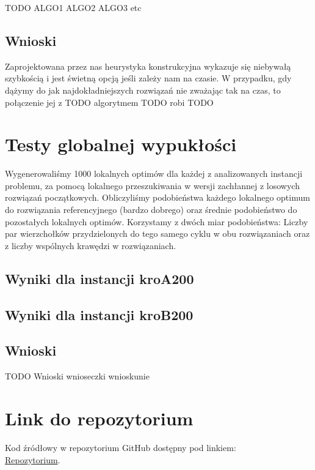 \documentclass[11pt]{article}
\begin{document}
TODO
ALGO1
ALGO2
ALGO3
etc

\subsection{Wnioski}\label{subsec:wnioski}
Zaprojektowana przez nas heurystyka konstrukcyjna wykazuje się niebywałą szybkością i jest świetną opcją jeśli zależy nam na czasie.
W przypadku, gdy dążymy do jak najdokładniejszych rozwiązań nie zważając tak na czas, to połączenie jej z TODO algorytmem TODO robi TODO


\section{Testy globalnej wypukłości}\label{sec:testy-globalnej-wypukosci}

Wygenerowaliśmy 1000 lokalnych optimów dla każdej z analizowanych instancji problemu, za pomocą lokalnego przeszukiwania w wersji zachłannej z losowych rozwiązań początkowych.
Obliczyliśmy podobieństwa każdego lokalnego optimum do rozwiązania referencyjnego (bardzo dobrego) oraz średnie podobieństwo do pozostałych lokalnych optimów.
Korzystamy z dwóch miar podobieństwa: Liczby par wierzchołków przydzielonych do tego samego cyklu w obu rozwiązaniach oraz z liczby wspólnych krawędzi w rozwiązaniach.

\subsection{Wyniki dla instancji kroA200}\label{subsec:wyniki-dla-instancji-kroa200}

\subsection{Wyniki dla instancji kroB200}\label{subsec:wyniki-dla-instancji-krob200}


\subsection{Wnioski}\label{subsec:wnioski-wypuklosci}

TODO
Wnioski wnioseczki wnioskunie


\section{Link do repozytorium}\label{sec:link-do-repo}
Kod źródłowy w repozytorium GitHub dostępny pod linkiem: \\
\href{https://github.com/KotZPolibudy/PUT_IMO/tree/main/Lab6%20-%20Testy%20wypuklosci%20i%20wlasna%20metoda}{Repozytorium}.
\end{document}
